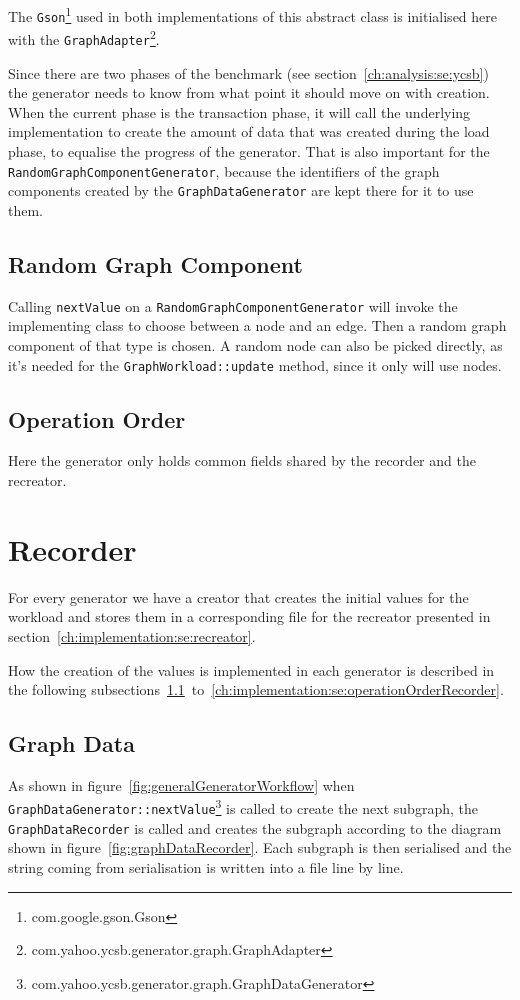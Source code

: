 The \texttt{Gson}\footnote{com.google.gson.Gson} used in both implementations of this abstract class is initialised here with the \texttt{GraphAdapter}\footnote{com.yahoo.ycsb.generator.graph.GraphAdapter}.

Since there are two phases of the benchmark (see section~\ref{ch:analysis:se:ycsb}) the generator needs to know from what point it should move on with creation.
When the current phase is the transaction phase,
it will call the underlying implementation to create the amount of data that was created during the load phase,
to equalise the progress of the generator.
That is also important for the \texttt{RandomGraphComponentGenerator},
because the identifiers of the graph components created by the \texttt{GraphDataGenerator} are kept there for it to use them.

\subsection{Random Graph Component}
Calling \texttt{nextValue} on a \texttt{RandomGraphComponentGenerator} will invoke the implementing class to choose between a node and an edge.
Then a random graph component of that type is chosen.
A random node can also be picked directly,
as it's needed for the \texttt{GraphWorkload::update} method,
since it only will use nodes.

\subsection{Operation Order}
Here the generator only holds common fields shared by the recorder and the recreator.

\section{Recorder}
\label{ch:implementation:se:recorder}
For every generator we have a creator that creates the initial values for the workload and stores them in a corresponding file for the recreator presented in section~\ref{ch:implementation:se:recreator}.

How the creation of the values is implemented in each generator is described in the following subsections~\ref{ch:implementation:se:graphDataRecorder}~to~\ref{ch:implementation:se:operationOrderRecorder}.

\subsection{Graph Data}
\label{ch:implementation:se:graphDataRecorder}
As shown in figure~\ref{fig:generalGeneratorWorkflow} when \texttt{GraphDataGenerator::nextValue}\footnote{com.yahoo.ycsb.generator.graph.GraphDataGenerator} is called to create the next subgraph,
the \texttt{GraphDataRecorder} is called and creates the subgraph according to the diagram shown in figure~\ref{fig:graphDataRecorder}.
Each subgraph is then serialised and the string coming from serialisation is written into a file line by line.

